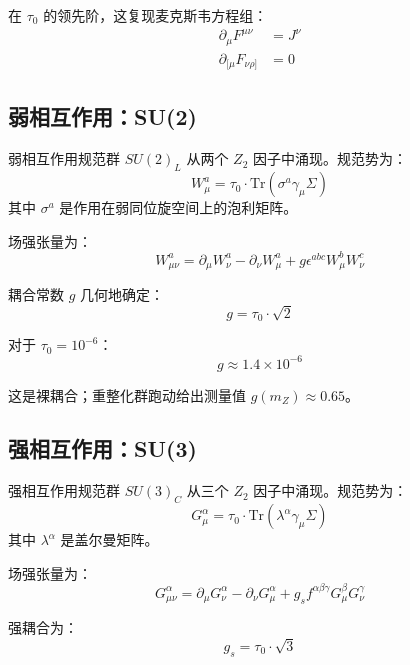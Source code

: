 在 $\tau_0$ 的领先阶，这复现麦克斯韦方程组：
\begin{align}
    \partial_\mu F^{\mu\nu} &= J^\nu \\
    \partial_{[\mu} F_{\nu\rho]} &= 0
\end{align}

\subsection{弱相互作用：SU(2)}

弱相互作用规范群 $SU(2)_L$ 从两个 $Z_2$ 因子中涌现。规范势为：
\begin{equation}
    W^a_\mu = \tau_0 \cdot \text{Tr}(\sigma^a \gamma_\mu \Sigma)
\end{equation}
其中 $\sigma^a$ 是作用在弱同位旋空间上的泡利矩阵。

场强张量为：
\begin{equation}
    W^a_{\mu\nu} = \partial_\mu W^a_\nu - \partial_\nu W^a_\mu + g \epsilon^{abc} W^b_\mu W^c_\nu
\end{equation}

耦合常数 $g$ 几何地确定：
\begin{equation}
    g = \tau_0 \cdot \sqrt{2}
\end{equation}

对于 $\tau_0 = 10^{-6}$：
\begin{equation}
    g \approx 1.4 \times 10^{-6}
\end{equation}

这是裸耦合；重整化群跑动给出测量值 $g(m_Z) \approx 0.65$。

\subsection{强相互作用：SU(3)}

强相互作用规范群 $SU(3)_C$ 从三个 $Z_2$ 因子中涌现。规范势为：
\begin{equation}
    G^\alpha_\mu = \tau_0 \cdot \text{Tr}(\lambda^\alpha \gamma_\mu \Sigma)
\end{equation}
其中 $\lambda^\alpha$ 是盖尔曼矩阵。

场强张量为：
\begin{equation}
    G^\alpha_{\mu\nu} = \partial_\mu G^\alpha_\nu - \partial_\nu G^\alpha_\mu + g_s f^{\alpha\beta\gamma} G^\beta_\mu G^\gamma_\nu
\end{equation}

强耦合为：
\begin{equation}
    g_s = \tau_0 \cdot \sqrt{3}
\end{equation}

